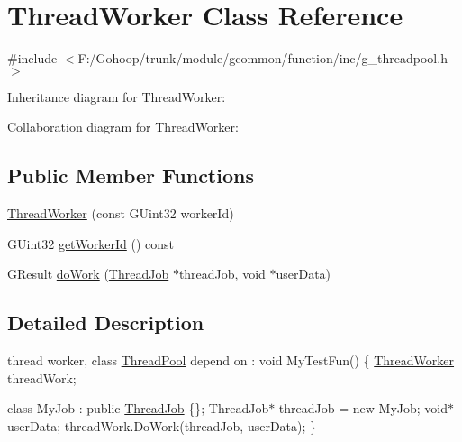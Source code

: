 \hypertarget{class_thread_worker}{\section{Thread\-Worker Class Reference}
\label{class_thread_worker}
}


{\ttfamily \#include $<$F\-:/\-Gohoop/trunk/module/gcommon/function/inc/g\-\_\-threadpool.\-h$>$}



Inheritance diagram for Thread\-Worker\-:


Collaboration diagram for Thread\-Worker\-:
\subsection*{Public Member Functions}
\begin{DoxyCompactItemize}
\item 
\hyperlink{class_thread_worker_aab0b03ce7564a625cc37b091be3eddcd}{Thread\-Worker} (const G\-Uint32 worker\-Id)
\item 
G\-Uint32 \hyperlink{class_thread_worker_a70bf08819fe584ec99aa22955895a24a}{get\-Worker\-Id} () const 
\item 
G\-Result \hyperlink{class_thread_worker_adba37834fdaa63a62eb10e6c145cfbc5}{do\-Work} (\hyperlink{class_thread_job}{Thread\-Job} $\ast$thread\-Job, void $\ast$user\-Data)
\end{DoxyCompactItemize}


\subsection{Detailed Description}
thread worker, class \hyperlink{class_thread_pool}{Thread\-Pool} depend on \-: void My\-Test\-Fun() \{ \hyperlink{class_thread_worker}{Thread\-Worker} thread\-Work;

class My\-Job \-: public \hyperlink{class_thread_job}{Thread\-Job} \{\}; Thread\-Job$\ast$ thread\-Job = new My\-Job; void$\ast$ user\-Data; thread\-Work.\-Do\-Work(thread\-Job, user\-Data); \} 

